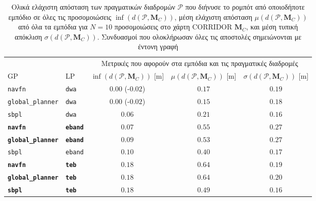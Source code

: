 \begin{table}[h]\hspace{-0.7cm}
\renewcommand{\arraystretch}{1.3}
\begin{tabular}{llccc}
  & & \multicolumn{3}{c}{Μετρικές που αφορούν στα εμπόδια και τις πραγματικές διαδρομές} \\
  \cline{3-5}
  GP & LP & $\inf(d(\bm{\mathcal{P}},\bm{M}_C))$ [m] & $\mu(d(\bm{\mathcal{P}},\bm{M}_C))$ [m] & $\sigma(d(\bm{\mathcal{P}},\bm{M}_C))$ [m] \\ \toprule
  \texttt{navfn} & \texttt{dwa} & \hspace{0.82cm} $0.00$ (-$0.02$) & $0.17$ & $0.19$ \\
  \texttt{global\_planner} & \texttt{dwa} & \hspace{0.82cm} $0.00$ (-$0.02$) & $0.15$ & $0.18$ \\
  \texttt{sbpl} & \texttt{dwa} & $0.06$ & $0.21$ & $0.16$ \\
  \textbf{\texttt{navfn}} & \textbf{\texttt{eband}} & $\bm{0.07}$ & $\bm{0.55}$ & $\bm{0.27}$ \\
  \textbf{\texttt{global\_planner}} & \textbf{\texttt{eband}} & $\bm{0.09}$ & $\bm{0.53}$ & $\bm{0.27}$ \\
  \texttt{sbpl} & \texttt{eband} & $0.10$ & $0.40$ & $0.17$ \\
  \textbf{\texttt{navfn}} & \textbf{\texttt{teb}} & $\bm{0.18}$ & $\bm{0.64}$ & $\bm{0.19}$ \\
  \textbf{\texttt{global\_planner}} & \textbf{\texttt{teb}} & $\bm{0.18}$ & $\bm{0.64}$ & $\bm{0.20}$ \\
  \textbf{\texttt{sbpl}} & \textbf{\texttt{teb}} & $\bm{0.18}$ & $\bm{0.49}$ & $\bm{0.16}$ \\ \bottomrule
\end{tabular}
\caption{\small Ολικά ελάχιστη απόσταση των πραγματικών διαδρομών
         $\bm{\mathcal{P}}$ που διήνυσε το ρομπότ από οποιοδήποτε εμπόδιο σε
         όλες τις προσομοιώσεις $\inf(d(\bm{\mathcal{P}},\bm{M}_C))$, μέση
         ελάχιστη απόσταση $\mu(d(\bm{\mathcal{P}},\bm{M}_C))$ από όλα τα
         εμπόδια για $N=10$ προσομοιώσεις στο χάρτη CORRIDOR $\bm{M}_C$, και μέση τυπική απόκλιση
         $\sigma(d(\bm{\mathcal{P}},\bm{M}_C))$. Συνδυασμοί που
         ολοκλήρωσαν όλες τις αποστολές σημειώνονται με έντονη γραφή}
\label{tbl:info_ground_truth_map_corridor}
\end{table}

